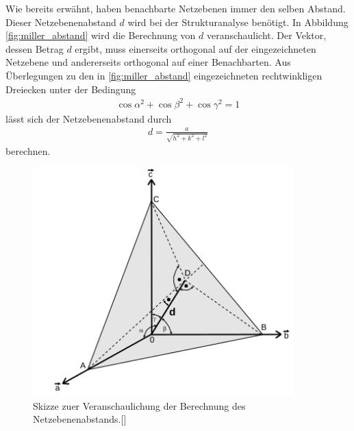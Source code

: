 Wie bereits erwähnt, haben benachbarte Netzebenen immer
den selben Abstand. Dieser Netzebenenabstand $d$ wird bei der
Strukturanalyse benötigt. In Abbildung \ref{fig:miller_abstand} wird
die Berechnung von $d$ veranschaulicht. Der Vektor, dessen Betrag $d$ ergibt,
muss einerseits orthogonal auf der eingezeichneten Netzebene und andererseits orthogonal
auf einer Benachbarten. Aus Überlegungen zu den in \ref{fig:miller_abstand}
eingezeichneten rechtwinkligen Dreiecken unter der Bedingung
\begin{align}
  \label{eqn:4}
  \cos\alpha^2 + \cos\beta^2 + \cos\gamma^2 = 1
\end{align}
lässt sich der Netzebenenabstand
durch
\begin{align}
  \label{eqn:5}
  d = \frac{a}{\sqrt{h^2 + k^2 + l^2}}
\end{align}
berechnen.

\begin{figure}[hhh]
  \centering
  \includegraphics[width=0.9\textwidth]{abbildungen/miller_dist.png}
  \caption{Skizze zuer Veranschaulichung der Berechnung des Netzebenenabstands.[\cite{sample}]}
\end{figure}

